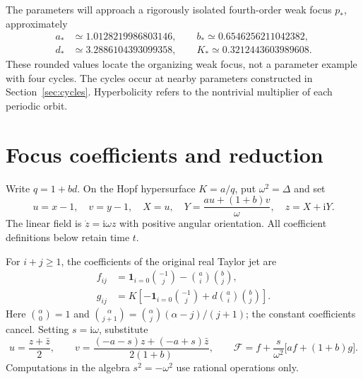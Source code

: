 \documentclass[11pt,a4paper]{article}
\theoremstyle{remark}
\newcommand{\ii}{\mathrm i}
\newcommand{\bino}[2]{\binom{#1}{#2}}
\numberwithin{equation}{section}
\begin{document}
The parameters will approach a rigorously isolated fourth-order weak
focus $p_*$, approximately
\begin{equation}\label{eq:pstar}
 \begin{split}
 a_*&\simeq1.0128219986803146,\qquad b_*\simeq0.6546256211042382,\\
 d_*&\simeq3.2886104393099358,\qquad K_*\simeq0.3212443603989608.
 \end{split}
\end{equation}
These rounded values locate the organizing weak focus, not a parameter
example with four cycles. The cycles occur at nearby parameters
constructed in Section~\ref{sec:cycles}. Hyperbolicity refers to the
nontrivial multiplier of each periodic orbit.

\section{Focus coefficients and reduction}\label{sec:coefficients}
Write $q=1+bd$. On the Hopf hypersurface $K=a/q$, put
$\omega^2=\Delta$ and set
\begin{equation}\label{eq:basis}
 u=x-1,\quad v=y-1,\quad X=u,\quad
 Y=\frac{au+(1+b)v}{\omega},\quad z=X+\ii Y.
\end{equation}
The linear field is $\dot z=\ii\omega z$ with positive angular orientation.
All coefficient definitions below retain time $t$.

For $i+j\geq1$, the coefficients of the original real Taylor jet are
\begin{equation}\label{eq:jet}
 \begin{split}
 f_{ij}&=\mathbf1_{i=0}\bino{-1}{j}-\bino a i\bino b j,\\
 g_{ij}&=K\left[-\mathbf1_{i=0}\bino{-1}{j}
                  +d\bino a i\bino b j\right].
 \end{split}
\end{equation}
Here $\binom\alpha0=1$ and
$\binom\alpha{j+1}=\binom\alpha j(\alpha-j)/(j+1)$; the constant
coefficients cancel. Setting $s=\ii\omega$, substitute
\begin{equation}\label{eq:complex-jet}
 u=\frac{z+\bar z}{2},\qquad
 v=\frac{(-a-s)z+(-a+s)\bar z}{2(1+b)},\qquad
 \mathcal F=f+\frac{s}{\omega^2}\bigl[af+(1+b)g\bigr].
\end{equation}
Computations in the algebra $s^2=-\omega^2$ use rational operations only.
\end{document}
